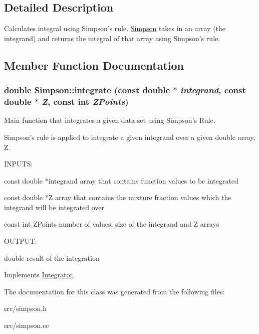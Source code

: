 \subsection{Detailed Description}
Calculates integral using Simpson's rule. \hyperlink{classSimpson}{Simpson} takes in an array (the integrand) and returns the integral of that array using Simpson's rule. 

\subsection{Member Function Documentation}
\hypertarget{classSimpson_ab90da2fb197efe2f4a669bf5029a16f4}{
\subsubsection[{integrate}]{\setlength{\rightskip}{0pt plus 5cm}double Simpson::integrate (const double $\ast$ {\em integrand}, \/  const double $\ast$ {\em Z}, \/  const int {\em ZPoints})}}
\label{d7/d99/classSimpson_ab90da2fb197efe2f4a669bf5029a16f4}


Main function that integrates a given data set using Simpson's Rule. 

Simpson's rule is applied to integrate a given integrand over a given double array, Z.

\begin{DoxyVerb}
  INPUTS: 

  const double *integrand           array that contains function values to be integrated

  const double *Z                   array that contains the mixture fraction values which the integrand will be integrated over

  const int ZPoints                 number of values, size of the integrand and Z arrays


  OUTPUT:

  double                            result of the integration

  \end{DoxyVerb}
 

Implements \hyperlink{classIntegrator_a89fbef2f7923ce4e2c979b2ff1d1f4ac}{Integrator}.



The documentation for this class was generated from the following files:\begin{DoxyCompactItemize}
\item 
src/simpson.h\item 
src/simpson.cc\end{DoxyCompactItemize}
